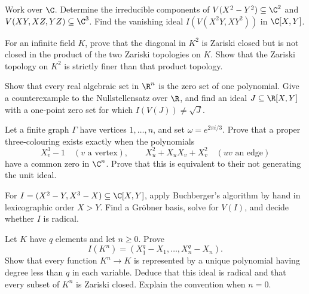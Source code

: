 \begin{exercise}[$\star$]\label{ex:radicals}
Work over $\C$. Determine the irreducible components of $V(X^2-Y^2)\subseteq\C^2$ and $V(XY,XZ,YZ)\subseteq\C^3$. Find the vanishing ideal $I(V(X^2Y,XY^2))$ in $\C[X,Y]$.
\end{exercise}

\begin{exercise}[$\star\star$]\label{ex:notproduct}
For an infinite field $K$, prove that the diagonal in $K^2$ is Zariski closed but is not closed in the product of the two Zariski topologies on $K$. Show that the Zariski topology on $K^2$ is strictly finer than that product topology.
\end{exercise}

\begin{exercise}[$\star\star$]\label{ex:realnull}
Show that every real algebraic set in $\R^n$ is the zero set of one polynomial. Give a counterexample to the Nullstellensatz over $\R$, and find an ideal $J\subseteq\R[X,Y]$ with a one-point zero set for which $I(V(J))\ne\sqrt J$.
\end{exercise}

\begin{exercise}[$\star\star$]\label{ex:colouring}
Let a finite graph $\Gamma$ have vertices $1,\ldots,n$, and set $\omega=e^{2\pi i/3}$. Prove that a proper three-colouring exists exactly when the polynomials
\[
X_v^3-1\quad(v\text{ a vertex}),\qquad
X_u^2+X_uX_v+X_v^2\quad(uv\text{ an edge})
\]
have a common zero in $\C^n$. Prove that this is equivalent to their not generating the unit ideal.
\end{exercise}

\begin{exercise}[$\star\star$]\label{ex:groebnerhand}
For $I=(X^2-Y,X^3-X)\subseteq\C[X,Y]$, apply Buchberger's algorithm by hand in lexicographic order $X>Y$. Find a Gröbner basis, solve for $V(I)$, and decide whether $I$ is radical.
\end{exercise}

\begin{exercise}[$\star\star\star$]\label{ex:v10new-ch04-finitefield}
Let $K$ have $q$ elements and let $n\ge0$. Prove
\[
I(K^n)=(X_1^q-X_1,\ldots,X_n^q-X_n).
\]
Show that every function $K^n\to K$ is represented by a unique polynomial having degree less than $q$ in each variable. Deduce that this ideal is radical and that every subset of $K^n$ is Zariski closed. Explain the convention when $n=0$.
\end{exercise}

